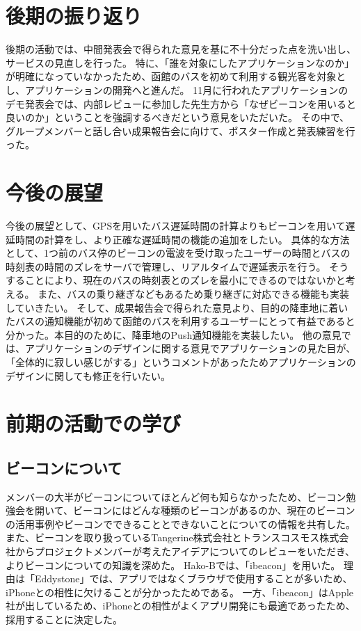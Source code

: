 \documentclass[openany,11pt,papersize]{jsbook}
\begin{document}

\section{後期の振り返り}
後期の活動では、中間発表会で得られた意見を基に不十分だった点を洗い出し、サービスの見直しを行った。
特に、「誰を対象にしたアプリケーションなのか」が明確になっていなかったため、函館のバスを初めて利用する観光客を対象とし、アプリケーションの開発へと進んだ。
11月に行われたアプリケーションのデモ発表会では、内部レビューに参加した先生方から「なぜビーコンを用いると良いのか」ということを強調するべきだという意見をいただいた。
その中で、グループメンバーと話し合い成果報告会に向けて、ポスター作成と発表練習を行った。


\section{今後の展望}
今後の展望として、GPSを用いたバス遅延時間の計算よりもビーコンを用いて遅延時間の計算をし、より正確な遅延時間の機能の追加をしたい。
具体的な方法として、1つ前のバス停のビーコンの電波を受け取ったユーザーの時間とバスの時刻表の時間のズレをサーバで管理し、リアルタイムで遅延表示を行う。
そうすることにより、現在のバスの時刻表とのズレを最小にできるのではないかと考える。
また、バスの乗り継ぎなどもあるため乗り継ぎに対応できる機能も実装していきたい。
そして、成果報告会で得られた意見より、目的の降車地に着いたバスの通知機能が初めて函館のバスを利用するユーザーにとって有益であると分かった。本目的のために、降車地のPush通知機能を実装したい。
他の意見では、アプリケーションのデザインに関する意見でアプリケーションの見た目が、「全体的に寂しい感じがする」というコメントがあったためアプリケーションのデザインに関しても修正を行いたい。



\section{前期の活動での学び}
\subsection{ビーコンについて}
メンバーの大半がビーコンについてほとんど何も知らなかったため、ビーコン勉強会を開いて、ビーコンにはどんな種類のビーコンがあるのか、現在のビーコンの活用事例やビーコンでできることとできないことについての情報を共有した。
また、ビーコンを取り扱っているTangerine株式会社とトランスコスモス株式会社からプロジェクトメンバーが考えたアイデアについてのレビューをいただき、よりビーコンについての知識を深めた。
Hako-Bでは、「ibeacon」を用いた。
理由は「Eddystone」では、アプリではなくブラウザで使用することが多いため、iPhoneとの相性に欠けることが分かったためである。
一方、「ibeacon」はApple社が出しているため、iPhoneとの相性がよくアプリ開発にも最適であったため、採用することに決定した。
\end{document}
